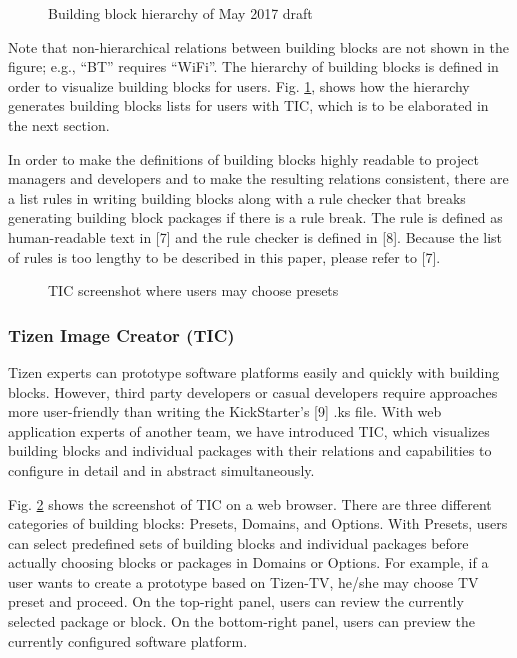 \begin{figure}
\label{FIG_TZN_TIC_SCRSHOT1}
\caption{Building block hierarchy of May 2017 draft}
\end{figure}

Note that non-hierarchical relations between building blocks are not shown in the figure; e.g., “BT” requires “WiFi”. The hierarchy of building blocks is defined in order to visualize building blocks for users. Fig. \ref{FIG_TZN_TIC_SCRSHOT1}, shows how the hierarchy generates building blocks lists for users with TIC, which is to be elaborated in the next section. 


In order to make the definitions of building blocks highly readable to project managers and developers and to make the resulting relations consistent, there are a list rules in writing building blocks along with a rule checker that breaks generating building block packages if there is a rule break. The rule is defined as human-readable text in [7] and the rule checker is defined in [8]. Because the list of rules is too lengthy to be described in this paper, please refer to [7].


\begin{figure}
\label{FIG_TZN_TIC_SCRSHOT2}
\caption{TIC screenshot where users may choose presets}
\end{figure}

\subsubsection{Tizen Image Creator (TIC)}

Tizen experts can prototype software platforms easily and quickly with building blocks. However, third party developers or casual developers require approaches more user-friendly than writing the KickStarter’s [9] .ks file. With web application experts of another team, we have introduced TIC, which visualizes building blocks and individual packages with their relations and capabilities to configure in detail and in abstract simultaneously.


Fig. \ref{FIG_TZN_TIC_SCRSHOT2} shows the screenshot of TIC on a web browser. There are three different categories of building blocks: Presets, Domains, and Options. With Presets, users can select predefined sets of building blocks and individual packages before actually choosing blocks or packages in Domains or Options. For example, if a user wants to create a prototype based on Tizen-TV, he/she may choose TV preset and proceed. On the top-right panel, users can review the currently selected package or block. On the bottom-right panel, users can preview the currently configured software platform.


